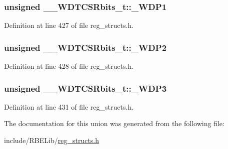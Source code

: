 \hypertarget{union_____w_d_t_c_s_rbits__t_a8f89eeb3dba6840dd17deacdccaf43a0}{
\subsubsection[{\+\_\+\+W\+D\+P1}]{\setlength{\rightskip}{0pt plus 5cm}unsigned \+\_\+\+\_\+\+W\+D\+T\+C\+S\+Rbits\+\_\+t\+::\+\_\+\+W\+D\+P1}}\label{union_____w_d_t_c_s_rbits__t_a8f89eeb3dba6840dd17deacdccaf43a0}


Definition at line 427 of file reg\+\_\+structs.\+h.

\hypertarget{union_____w_d_t_c_s_rbits__t_adaa88b095700be47bb573761bdcdd774}{
\subsubsection[{\+\_\+\+W\+D\+P2}]{\setlength{\rightskip}{0pt plus 5cm}unsigned \+\_\+\+\_\+\+W\+D\+T\+C\+S\+Rbits\+\_\+t\+::\+\_\+\+W\+D\+P2}}\label{union_____w_d_t_c_s_rbits__t_adaa88b095700be47bb573761bdcdd774}


Definition at line 428 of file reg\+\_\+structs.\+h.

\hypertarget{union_____w_d_t_c_s_rbits__t_a214c1e1e7821e33b913f5d61b95a64a8}{
\subsubsection[{\+\_\+\+W\+D\+P3}]{\setlength{\rightskip}{0pt plus 5cm}unsigned \+\_\+\+\_\+\+W\+D\+T\+C\+S\+Rbits\+\_\+t\+::\+\_\+\+W\+D\+P3}}\label{union_____w_d_t_c_s_rbits__t_a214c1e1e7821e33b913f5d61b95a64a8}


Definition at line 431 of file reg\+\_\+structs.\+h.



The documentation for this union was generated from the following file\+:\begin{DoxyCompactItemize}
\item 
include/\+R\+B\+E\+Lib/\hyperlink{reg__structs_8h}{reg\+\_\+structs.\+h}\end{DoxyCompactItemize}
